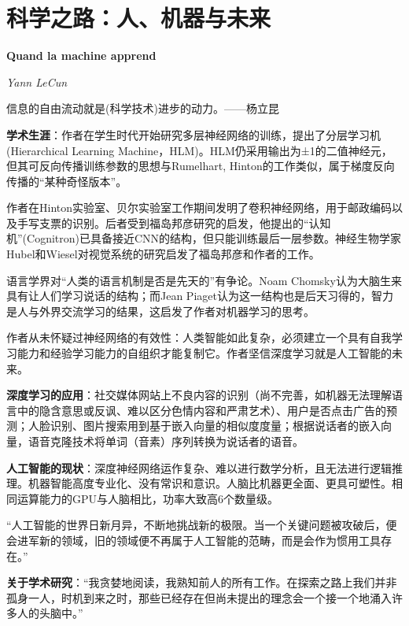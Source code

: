 \chapter{科学之路：人、机器与未来}
\Large\textbf{Quand la machine apprend}
\par \emph{Yann LeCun} \normalsize

\par 信息的自由流动就是(科学技术)进步的动力。——杨立昆

\par \textbf{学术生涯}：作者在学生时代开始研究多层神经网络的训练，提出了分层学习机 (Hierarchical Learning Machine，HLM)。HLM仍采用输出为±1的二值神经元，但其可反向传播训练参数的思想与Rumelhart, Hinton的工作类似，属于梯度反向传播的“某种奇怪版本”。
\par 作者在Hinton实验室、贝尔实验室工作期间发明了卷积神经网络，用于邮政编码以及手写支票的识别。后者受到福岛邦彦研究的启发，他提出的“认知机”(Cognitron)已具备接近CNN的结构，但只能训练最后一层参数。神经生物学家Hubel和Wiesel对视觉系统的研究启发了福岛邦彦和作者的工作。
\par 语言学界对“人类的语言机制是否是先天的”有争论。Noam Chomsky认为大脑生来具有让人们学习说话的结构；而Jean Piaget认为这一结构也是后天习得的，智力是人与外界交流学习的结果，这启发了作者对机器学习的思考。
\par 作者从未怀疑过神经网络的有效性：人类智能如此复杂，必须建立一个具有自我学习能力和经验学习能力的自组织才能复制它。作者坚信深度学习就是人工智能的未来。

\par \textbf{深度学习的应用}：社交媒体网站上不良内容的识别（尚不完善，如机器无法理解语言中的隐含意思或反讽、难以区分色情内容和严肃艺术）、用户是否点击广告的预测；人脸识别、图片搜索用到基于嵌入向量的相似度度量；根据说话者的嵌入向量，语音克隆技术将单词（音素）序列转换为说话者的语音。

\par \textbf{人工智能的现状}：深度神经网络运作复杂、难以进行数学分析，且无法进行逻辑推理。机器智能高度专业化、没有常识和意识。人脑比机器更全面、更具可塑性。相同运算能力的GPU与人脑相比，功率大致高6个数量级。
\par “人工智能的世界日新月异，不断地挑战新的极限。当一个关键问题被攻破后，便会进军新的领域，旧的领域便不再属于人工智能的范畴，而是会作为惯用工具存在。”


\par \textbf{关于学术研究}：“我贪婪地阅读，我熟知前人的所有工作。在探索之路上我们并非孤身一人，时机到来之时，那些已经存在但尚未提出的理念会一个接一个地涌入许多人的头脑中。”

